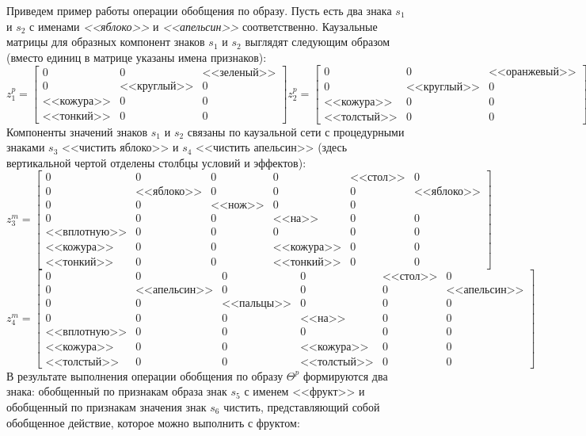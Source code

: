 \documentclass[12pt]{scrartcl}
\begin{document}
	Приведем пример работы операции обобщения по образу. Пусть есть два знака $s_1$ и $s_2$ с именами \textit{<<яблоко>>} и \textit{<<апельсин>>} соответственно. Каузальные матрицы для образных компонент знаков $s_1$ и $s_2$ выглядят следующим образом (вместо единиц в матрице указаны имена признаков):
	\[
	z_1^p = \begin{bmatrix}
	0&0& \text{<<зеленый>>} \\
	0& \text{<<круглый>>} &0 \\
	\text{<<кожура>>} &0 &0  \\
	\text{<<тонкий>>} &0 &0
	\end{bmatrix}
	z_2^p = \begin{bmatrix}
	0&0& \text{<<оранжевый>>} \\
	0& \text{<<круглый>>} &0 \\
	\text{<<кожура>>} &0 &0  \\
	\text{<<толстый>>} &0 &0
	\end{bmatrix}
	\]
	Компоненты значений знаков $s_1$ и $s_2$ связаны по каузальной сети с процедурными знаками $s_3$ <<чистить яблоко>> и $s_4$ <<чистить апельсин>> (здесь вертикальной чертой отделены столбцы условий и эффектов):
	\[
	z_3^m= \left[\begin{array}{ccc|cccc}
	0&0&0&0&\text{<<стол>>}&0\\
	0&\text{<<яблоко>>}&0& 0&0&\text{<<яблоко>>}\\
	0&0& \text{<<нож>>} &0 &0\\
	0& 0& 0 &\text{<<на>>} &0&0\\
	\text{<<вплотную>>}& 0& 0 &0 &0&0\\
	\text{<<кожура>>} &0 &0 &\text{<<кожура>>}  &0&0\\
	\text{<<тонкий>>} &0 &0 & \text{<<тонкий>>} &0&0
	\end{array}
	\right]
	\]
	\[
	z_4^m= \left[\begin{array}{ccc|cccc}
	0&0&0&0&\text{<<стол>>}&0\\
	0&\text{<<апельсин>>}&0& 0&0&\text{<<апельсин>>}\\
	0&0& \text{<<пальцы>>} &0 &0&0\\
	0& 0& 0 &\text{<<на>>} &0&0\\
	\text{<<вплотную>>}& 0& 0 &0 &0&0\\
	\text{<<кожура>>} &0 &0 &\text{<<кожура>>}  &0&0\\
	\text{<<толстый>>} &0 &0 & \text{<<толстый>>} &0&0
	\end{array}
	\right]
	\] 
	В результате выполнения операции обобщения по образу $\Theta^p$ формируются два знака: обобщенный по признакам образа знак $s_5$ с именем <<фрукт>> и обобщенный по признакам значения знак $s_6$ чистить, представляющий собой обобщенное действие, которое можно выполнить с фруктом:
	
\end{document}
